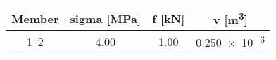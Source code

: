 \begin{tabular}{cccc}
    \toprule
    Member & \gls{sigma} [\unit{\mega\pascal}] & \gls{f} [\unit{\kilo\newton}] & \gls{v} [\unit{\meter^3}] \\
    \midrule
    \numrange[range-phrase = --]{1}{2} & \num{4.00} & \num{1.00} & \num{0.250e-3} \\
    \bottomrule
\end{tabular}